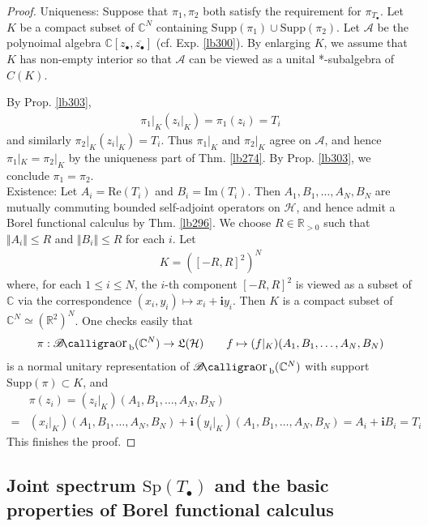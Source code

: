 \documentclass[12pt,b5paper,notitlepage]{article}
\theoremstyle{definition}
\theoremstyle{plain}
\DeclareMathOperator{\Borb}{{\mathscr{B}\text{\kern -2pt {\calligra\large or}}\,}_{\mathrm b}}
\newcommand{\fk}{\mathfrak}
\newcommand{\ovl}{\overline}
\newcommand{\scr}{\mathscr}
\newcommand{\im}{\mathbf{i}}
\newcommand{\blt}{\bullet}
\newcommand{\Cbb}{\mathbb C}
\newcommand{\Rbb}{\mathbb R}
\newcommand{\Sp}{\mathrm{Sp}}
\newcommand{\Real}{\mathrm{Re}}
\newcommand{\Imag}{\mathrm{Im}}
\newcommand{\Supp}{\mathrm{Supp}}
\newcommand{\MH}{\mathcal H}
\numberwithin{equation}{section}
\begin{document}
\begin{proof}
Uniqueness: Suppose that $\pi_1,\pi_2$ both satisfy the requirement for $\pi_{T_\blt}$. Let $K$ be a compact subset of $\Cbb^N$ containing $\Supp(\pi_1)\cup\Supp(\pi_2)$. Let $\scr A$ be the polynoimal algebra $\Cbb[z_\blt,\ovl{z_\blt}]$ (cf. Exp. \ref{lb300}). By enlarging $K$, we assume that $K$ has non-empty interior so that $\scr A$ can be viewed as a unital *-subalgebra of $C(K)$. 

By Prop. \ref{lb303},
\begin{align*}
\pi_1|_K(z_i|_K)=\pi_1(z_i)=T_i
\end{align*}
and similarly $\pi_2|_K(z_i|_K)=T_i$. Thus $\pi_1|_K$ and $\pi_2|_K$ agree on $\scr A$, and hence $\pi_1|_K=\pi_2|_K$ by the uniqueness part of Thm. \ref{lb274}. By Prop. \ref{lb303}, we conclude $\pi_1=\pi_2$.\\[-1ex]

Existence: Let $A_i=\Real(T_i)$ and $B_i=\Imag(T_i)$. Then $A_1,B_1,\dots,A_N,B_N$ are mutually commuting bounded self-adjoint operators on $\MH$, and hence admit a Borel functional calculus by Thm. \ref{lb296}. We choose $R\in\Rbb_{>0}$ such that $\Vert A_i\Vert\leq R$ and $\Vert B_i\Vert\leq R$ for each $i$. Let 
\begin{align*}
K=([-R,R]^2)^N
\end{align*}
where, for each $1\leq i\leq N$, the $i$-th component $[-R,R]^2$ is viewed as a subset of $\Cbb$ via the correspondence $(x_i,y_i)\mapsto x_i+\im y_i$. Then $K$ is a compact subset of $\Cbb^N\simeq(\Rbb^2)^N$. One checks easily that
\begin{align*}
\pi:\Borb(\Cbb^N)\rightarrow\fk L(\MH)\qquad f\mapsto (f|_K)(A_1,B_1,\dots,A_N,B_N)
\end{align*}
is a normal unitary representation of $\Borb(\Cbb^N)$ with support $\Supp(\pi)\subset K$, and
\begin{align*}
&\pi(z_i)=(z_i|_K)(A_1,B_1,\dots,A_N,B_N)\\
=&(x_i|_K)(A_1,B_1,\dots,A_N,B_N)+\im (y_i|_K)(A_1,B_1,\dots,A_N,B_N)=A_i+\im B_i=T_i
\end{align*}
This finishes the proof.
\end{proof}



\subsection{Joint spectrum $\Sp(T_\blt)$ and the basic properties of Borel functional calculus}\label{lb335}
\end{document}
